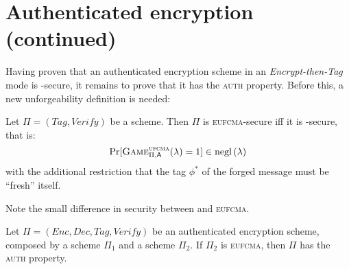 
\section{Authenticated encryption (continued)}

Having proven that an authenticated encryption scheme in an \emph{Encrypt-then-Tag} mode is \cpa-secure, it remains to prove that it has the \textsc{auth} property. Before this, a new unforgeability definition is needed:

\begin{definition}
    Let $\Pi = (\textit{Tag}, \textit{Verify})$ be a \mac{} scheme. Then $\Pi$ is \textsc{eufcma}-secure iff it is \ufcma-secure, that is:
    \[
        \Pr[\cryptog{ufcma}(\lambda) = 1] \in \negl{\lambda}
    \]
    with the additional restriction that the tag $\phi^*$ of the forged message must be ``fresh'' itself.
\end{definition}

Note the small difference in security between \ufcma{} and \textsc{eufcma}.

\begin{theorem}
    Let $\Pi = (Enc, Dec, Tag, Verify)$ be an authenticated encryption scheme, composed by a \ske{} scheme $\Pi_1$ and a \mac{} scheme $\Pi_2$. If $\Pi_2$ is \textsc{eufcma}, then $\Pi$ has the \textsc{auth} property.
\end{theorem}

